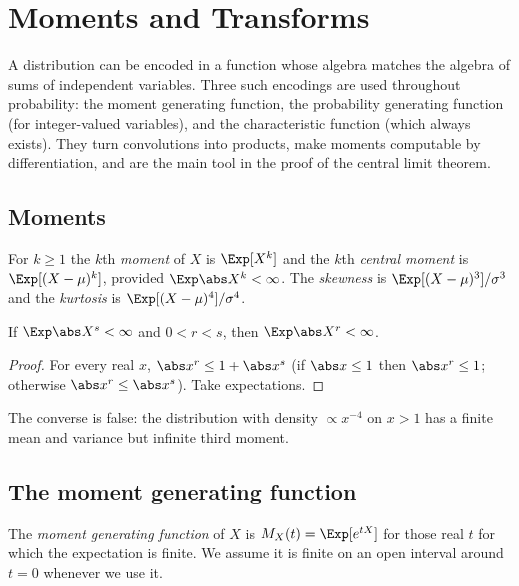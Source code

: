 \chapter{Moments and Transforms}
\label{ch:transforms}

A distribution can be encoded in a function whose algebra matches the algebra of
sums of independent variables. Three such encodings are used throughout probability:
the moment generating function, the probability generating function (for
integer-valued variables), and the characteristic function (which always exists).
They turn convolutions into products, make moments computable by
differentiation, and are the main tool in the proof of the central limit theorem.

\section{Moments}

\begin{definition}[Moments]
For $k\ge1$ the $k$th \emph{moment} of $X$ is $\Exp[X^k]$ and the $k$th
\emph{central moment} is $\Exp[(X-\mu)^k]$, provided $\Exp\abs X^k<\infty$. The
\emph{skewness} is $\Exp[(X-\mu)^3]/\sigma^3$ and the \emph{kurtosis} is
$\Exp[(X-\mu)^4]/\sigma^4$.
\end{definition}

\begin{proposition}\label{prop:lyapunov}
If $\Exp\abs X^s<\infty$ and $0<r<s$, then $\Exp\abs X^r<\infty$.
\end{proposition}
\begin{proof}
For every real $x$, $\abs x^r\le1+\abs x^s$ (if $\abs x\le1$ then $\abs x^r\le1$;
otherwise $\abs x^r\le\abs x^s$). Take expectations.
\end{proof}

The converse is false: the distribution with density $\propto x^{-4}$ on $x>1$ has
a finite mean and variance but infinite third moment.

\section{The moment generating function}

\begin{definition}[MGF]
The \emph{moment generating function} of $X$ is $M_X(t)=\Exp[e^{tX}]$ for those
real $t$ for which the expectation is finite. We assume it is finite on an open
interval around $t=0$ whenever we use it.
\end{definition}

